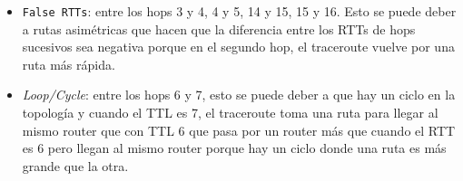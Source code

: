 \begin{itemize}
\item \texttt{False RTTs}: entre los hops 3 y 4, 4 y 5, 14 y 15, 15 y 16. Esto se puede deber a rutas asimétricas que hacen que la diferencia entre los RTTs de hops sucesivos sea negativa porque en el segundo hop, el traceroute vuelve por una ruta más rápida.
\item \textit{Loop/Cycle}: entre los hops 6 y 7, esto se puede deber a que hay un ciclo en la topología y cuando el TTL es 7, el traceroute toma una ruta para llegar al mismo router que con TTL 6 que pasa por un router más que cuando el RTT es 6 pero llegan al mismo router porque hay un ciclo donde una ruta es más grande que la otra.
\end{itemize}
